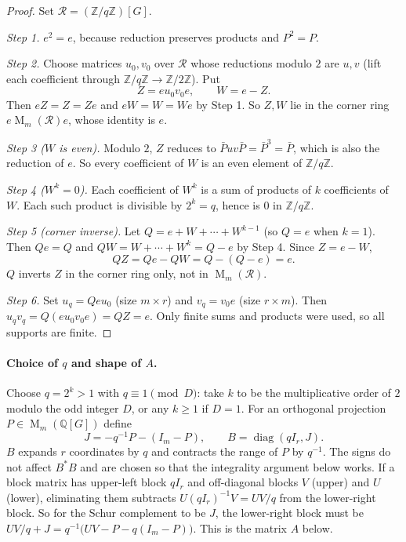 \documentclass[11pt]{article}
\theoremstyle{remark}
\numberwithin{equation}{section}
\newcommand{\Z}{\mathbb Z}
\newcommand{\Q}{\mathbb Q}
\newcommand{\Mat}{\operatorname{M}}
\newcommand{\diag}{\operatorname{diag}}
\begin{document}
\begin{proof}
Set $\mathcal R=(\Z/q\Z)[G]$.

\emph{Step 1.} $e^2=e$, because reduction preserves products and $P^2=P$.

\emph{Step 2.} Choose matrices $u_0,v_0$ over $\mathcal R$ whose reductions modulo $2$ are $u,v$ (lift each coefficient through $\Z/q\Z\to\Z/2\Z$). Put
\[
 Z=eu_0v_0e,\qquad W=e-Z.
\]
Then $eZ=Z=Ze$ and $eW=W=We$ by Step 1. So $Z,W$ lie in the corner ring $e\Mat_m(\mathcal R)e$, whose identity is $e$.

\emph{Step 3 ($W$ is even).} Modulo $2$, $Z$ reduces to $\bar Puv\bar P=\bar P^3=\bar P$, which is also the reduction of $e$. So every coefficient of $W$ is an even element of $\Z/q\Z$.

\emph{Step 4 ($W^k=0$).} Each coefficient of $W^k$ is a sum of products of $k$ coefficients of $W$. Each such product is divisible by $2^k=q$, hence is $0$ in $\Z/q\Z$.

\emph{Step 5 (corner inverse).} Let $Q=e+W+\cdots+W^{k-1}$ (so $Q=e$ when $k=1$). Then $Qe=Q$ and $QW=W+\cdots+W^k=Q-e$ by Step 4. Since $Z=e-W$,
\[
 QZ=Qe-QW=Q-(Q-e)=e .
\]
$Q$ inverts $Z$ in the corner ring only, not in $\Mat_m(\mathcal R)$.

\emph{Step 6.} Set $u_q=Qeu_0$ (size $m\times r$) and $v_q=v_0e$ (size $r\times m$). Then $u_qv_q=Q(eu_0v_0e)=QZ=e$. Only finite sums and products were used, so all supports are finite.
\end{proof}

\paragraph{Choice of $q$ and shape of $A$.} Choose $q=2^k>1$ with $q\equiv1\pmod D$: take $k$ to be the multiplicative order of $2$ modulo the odd integer $D$, or any $k\ge1$ if $D=1$. For an orthogonal projection $P\in\Mat_m(\Q[G])$ define
\begin{equation}\label{eq:JB}
 J=-q^{-1}P-(I_m-P),\qquad B=\diag(qI_r,J).
\end{equation}
$B$ expands $r$ coordinates by $q$ and contracts the range of $P$ by $q^{-1}$. The signs do not affect $B^*B$ and are chosen so that the integrality argument below works. If a block matrix has upper-left block $qI_r$ and off-diagonal blocks $V$ (upper) and $U$ (lower), eliminating them subtracts $U(qI_r)^{-1}V=UV/q$ from the lower-right block. So for the Schur complement to be $J$, the lower-right block must be $UV/q+J=q^{-1}\bigl(UV-P-q(I_m-P)\bigr)$. This is the matrix $A$ below.
\end{document}
